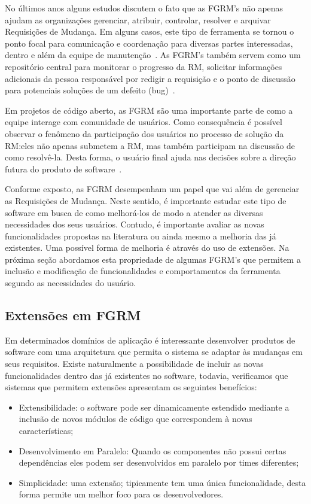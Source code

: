No últimos anos alguns estudos discutem o fato que as FGRM's não apenas ajudam
as organizações gerenciar, atribuir, controlar, resolver e arquivar Requisições
de Mudança. Em alguns casos, este tipo de ferramenta se tornou o ponto focal
para comunicação e coordenação para diversas partes interessadas, dentro e além
da equipe de manutenção~\cite{Bertram:2010:CCB:1718918.1718972}.  As FGRM's
também servem como um repositório central para monitorar o progresso da RM,
solicitar informações adicionais da pessoa responsável por redigir a requisição
e o ponto de discussão para potenciais soluções de um defeito
(bug)~\cite{zimmermann2009improving}.

Em projetos de código aberto, as FGRM são uma importante parte de como a equipe
interage com comunidade de usuários. Como consequência é possível observar o
fenômeno da participação dos usuários no processo de solução da RM:\@ eles não
apenas submetem a RM, mas também participam na discussão de como resolvê-la.
Desta forma, o usuário final ajuda nas decisões sobre a direção futura do
produto de software~\cite{breu2010information}.

Conforme exposto, as FGRM desempenham um papel que vai além de gerenciar as
Requisições de Mudança.  Neste sentido, é importante estudar este tipo de
software em busca de como melhorá-los de modo a atender as diversas necessidades
dos seus usuários. Contudo, é importante avaliar as novas funcionalidades
propostas na li\-te\-ra\-tu\-ra ou ainda mesmo a melhoria das já existentes. Uma
possível forma de melhoria é através do uso de extensões. Na próxima seção
abordamos esta propriedade de algumas FGRM's que permitem a inclusão e
modificação de funcionalidades e comportamentos da ferramenta segundo as
necessidades do usuário.

\subsection{Extensões em FGRM}
\label{subsec:manutencao_visao_geral_extensoes_fgrm}

Em determinados domínios de aplicação é interessante desenvolver produtos de
software com uma arquitetura que permita o sistema se adaptar às mudanças em
seus requisitos. Existe naturalmente a possibilidade de incluir as novas
funcionalidades dentro das já existentes no software, todavia, verificamos que
sistemas que permitem extensões apresentam os seguintes benefícios:

\begin{itemize}
	\item Extensibilidade: o software pode ser dinamicamente estendido mediante
		a inclusão de novos módulos de código que correspondem à novas
		características;
	\item Desenvolvimento em Paralelo: Quando os componentes não possui certas
		dependências eles podem ser desenvolvidos em paralelo por times
		diferentes;
	\item Simplicidade: uma  extensão; tipicamente tem uma única funcionalidade,
		desta forma permite um melhor foco para os desenvolvedores.
\end{itemize}

